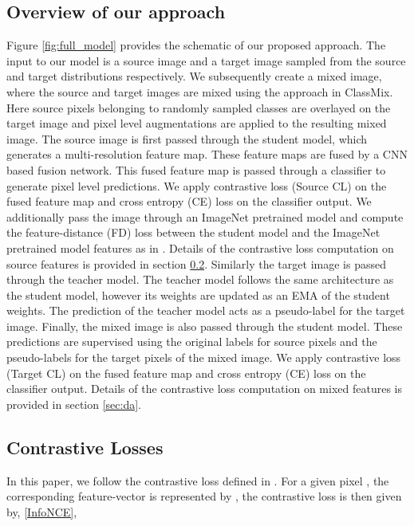 \documentclass{article}
\begin{document}
\subsection{Overview of our approach}
 Figure \ref{fig:full_model} provides the schematic of our proposed approach. The input to our model is a source image and a target image sampled from the source and target distributions respectively. We subsequently create a mixed image, where the source and target images are mixed using the approach in ClassMix\cite{olsson2021classmix}. Here source pixels belonging to randomly sampled classes are overlayed on the target image and pixel level augmentations are applied to the resulting mixed image. The source image  is first passed through the student model, which generates a multi-resolution feature map. These feature maps are fused by a CNN based fusion network. This fused feature map is passed through a classifier to generate pixel level predictions. We apply contrastive loss (Source CL) on the fused feature map and cross entropy (CE) loss on the classifier output. We additionally pass the image through an ImageNet \cite{deng2009imagenet} pretrained model and compute the feature-distance (FD) loss between the student model and the ImageNet pretrained model features as in \cite{hoyer2021daformer}. Details of the contrastive loss computation on source features is provided in section \ref{sec:cl}. Similarly the target image  is passed through the teacher model. The teacher model follows the same architecture as the student model, however its weights are updated as an EMA of the student weights. The prediction of the teacher model acts as a pseudo-label for the target image. Finally, the mixed image  is also passed through the student model. These predictions are supervised using the original labels for source pixels and the pseudo-labels for the target pixels of the mixed image. We apply contrastive loss (Target CL) on the fused feature map and cross entropy (CE) loss on the classifier output. Details of the contrastive loss computation on mixed features is provided in section \ref{sec:da}.


\subsection{Contrastive Losses} \label{sec:cl}
In this paper, we follow the contrastive loss defined in \cite{wang2021exploring}. For a given pixel , the corresponding feature-vector is represented by , the contrastive loss  is then given by, \ref{InfoNCE},
\end{document}
